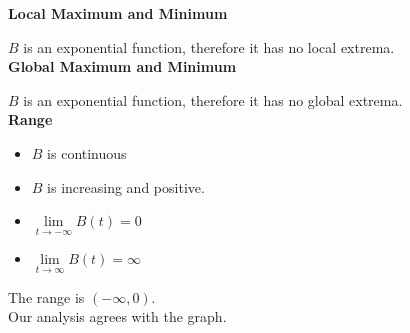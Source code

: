 \documentclass{ximera}
\begin{document}
\begin{example}
\textbf{Local Maximum and Minimum}

$B$ is an exponential function, therefore it has no local extrema. \\





\textbf{Global Maximum and Minimum}

$B$ is an exponential function, therefore it has no global extrema. \\





\textbf{Range}

 
\begin{itemize}
\item $B$ is continuous
\item $B$ is increasing and positive.
\item $\lim\limits_{t \to -\infty} B(t) = 0$
\item $\lim\limits_{t \to \infty} B(t) = \infty$
\end{itemize}


The range is $(-\infty, 0)$. \\










Our analysis agrees with the graph. \\




\end{example}
\end{document}
